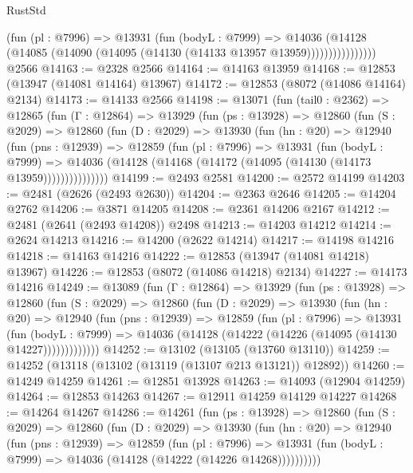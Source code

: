 \begin{lexlean}{RustStd}
\begin{coremodule}
                    (fun (pl : @7996) =>
                    @13931
                      (fun (bodyL : @7999) =>
                      @14036
                        (@14128
                          (@14085 (@14090 (@14095 (@14130 (@14133 @13957 @13959))))))))))))))))
    @2566
@14163 := @2328 @2566
@14164 := @14163 @13959
@14168 := @12853 (@13947 (@14081 @14164) @13967)
@14172 := @12853 (@8072 (@14086 @14164) @2134)
@14173 := @14133 @2566
@14198 := @13071
    (fun (tail0 : @2362) =>
    @12865
      (fun (Γ : @12864) =>
      @13929
        (fun (ps : @13928) =>
        @12860
          (fun (S : @2029) =>
          @12860
            (fun (D : @2029) =>
            @13930
              (fun (hn : @20) =>
              @12940
                (fun (pns : @12939) =>
                @12859
                  (fun (pl : @7996) =>
                  @13931
                    (fun (bodyL : @7999) =>
                    @14036 (@14128 (@14168 (@14172 (@14095 (@14130 (@14173 @13959)))))))))))))))
@14199 := @2493 @2581
@14200 := @2572 @14199
@14203 := @2481 (@2626 (@2493 @2630))
@14204 := @2363 @2646
@14205 := @14204 @2762
@14206 := @3871 @14205
@14208 := @2361 @14206 @2167
@14212 := @2481 (@2641 (@2493 @14208)) @2498
@14213 := @14203 @14212
@14214 := @2624 @14213
@14216 := @14200 (@2622 @14214)
@14217 := @14198 @14216
@14218 := @14163 @14216
@14222 := @12853 (@13947 (@14081 @14218) @13967)
@14226 := @12853 (@8072 (@14086 @14218) @2134)
@14227 := @14173 @14216
@14249 := @13089
    (fun (Γ : @12864) =>
    @13929
      (fun (ps : @13928) =>
      @12860
        (fun (S : @2029) =>
        @12860
          (fun (D : @2029) =>
          @13930
            (fun (hn : @20) =>
            @12940
              (fun (pns : @12939) =>
              @12859
                (fun (pl : @7996) =>
                @13931
                  (fun (bodyL : @7999) =>
                  @14036 (@14128 (@14222 (@14226 (@14095 (@14130 @14227)))))))))))))
@14252 := @13102 (@13105 (@13760 @13110))
@14259 := @14252 (@13118 (@13102 (@13119 (@13107 @213 @13121)) @12892))
@14260 := @14249 @14259
@14261 := @12851 @13928
@14263 := @14093 (@12904 @14259)
@14264 := @12853 @14263
@14267 := @12911 @14259 @14129 @14227
@14268 := @14264 @14267
@14286 := @14261
    (fun (ps : @13928) =>
    @12860
      (fun (S : @2029) =>
      @12860
        (fun (D : @2029) =>
        @13930
          (fun (hn : @20) =>
          @12940
            (fun (pns : @12939) =>
            @12859
              (fun (pl : @7996) =>
              @13931 (fun (bodyL : @7999) => @14036 (@14128 (@14222 (@14226 @14268))))))))))

\end{coremodule}
\end{lexlean}
